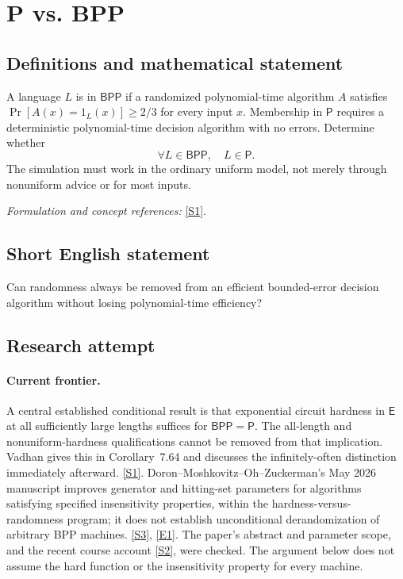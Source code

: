 \documentclass[11pt,a4paper]{article}
\newcommand{\sref}[2]{\hyperlink{source:#1:#2}{[S#2]}}
\newcommand{\eref}[2]{\hyperlink{extra:#1:#2}{[E#2]}}
\newif\ifshowcatalogue
\newcommand{\cataloguescope}[1]{\ifshowcatalogue
 \paragraph{Exact scope in the supplied catalogue.}
 \begin{quote}\small #1\end{quote}\fi}
\numberwithin{equation}{section}
\begin{document}
\setcounter{section}{0}
\clearpage
\section*{\texorpdfstring{P vs. BPP}{P vs. BPP}}\label{statement}
\subsection{Definitions and mathematical statement}
A language $L$ is in $\mathsf{BPP}$ if a randomized polynomial-time algorithm $A$ satisfies $\Pr[A(x)=1_L(x)]\ge2/3$ for every input $x$. Membership in $\mathsf P$ requires a deterministic polynomial-time decision algorithm with no errors. Determine whether
\[
 \forall L\in\mathsf{BPP},\quad L\in\mathsf P.
\]
The simulation must work in the ordinary uniform model, not merely through nonuniform advice or for most inputs.
\par\smallskip\textit{Formulation and concept references:} \sref{statement}{1}.
\cataloguescope{Determine whether every language computable by a probabilistic polynomial-time algorithm with bounded two-sided error (BPP) can be computed by a deterministic polynomial-time algorithm, i.e., whether BPP = P.}
\subsection{Short English statement}
Can randomness always be removed from an efficient bounded-error decision algorithm without losing polynomial-time efficiency?
\subsection{Research attempt}

\paragraph{Current frontier.}
A central established conditional result is that exponential circuit
hardness in $\mathsf E$ at all sufficiently large lengths suffices for
$\mathsf{BPP}=\mathsf P$. The all-length and nonuniform-hardness
qualifications cannot be removed from that implication. Vadhan gives
this in Corollary~7.64 and discusses the infinitely-often distinction
immediately afterward. \sref{statement}{1}. Doron--Moshkovitz--Oh--Zuckerman's
May 2026 manuscript improves generator and hitting-set parameters for
algorithms satisfying specified insensitivity properties, within the
hardness-versus-randomness program; it does not establish unconditional
derandomization of arbitrary BPP machines. \sref{statement}{3}, \eref{statement}{1}.
The paper's abstract and parameter scope, and the recent course account
\sref{statement}{2}, were checked. The argument below does not assume the hard
function or the insensitivity property for every machine.
\end{document}
